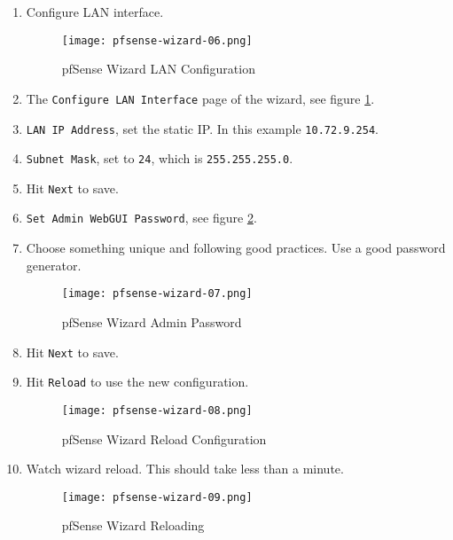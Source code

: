 \begin{enumerate}
 \item Configure LAN interface.
\begin{figure}[h!]
\begin{center}
\texttt{[image: pfsense-wizard-06.png]}
 \caption{pfSense Wizard LAN Configuration}
 \label{fig:pfsense-wizard-06}
\end{center}
\end{figure}

 \item The \texttt{Configure LAN Interface} page of the wizard, see figure \ref{fig:pfsense-wizard-06}.
 \item \texttt{LAN IP Address}, set the static IP. In this example \texttt{10.72.9.254}.
 \item \texttt{Subnet Mask}, set to \texttt{24}, which is \texttt{255.255.255.0}.
 \item Hit \texttt{Next} to save.

 \item \texttt{Set Admin WebGUI Password}, see figure \ref{fig:pfsense-wizard-07}.
 \item Choose something unique and following good practices. Use a good password generator.
\begin{figure}[h!]
\begin{center}
\texttt{[image: pfsense-wizard-07.png]}
 \caption{pfSense Wizard Admin Password}
 \label{fig:pfsense-wizard-07}
\end{center}
\end{figure}
 \item Hit \texttt{Next} to save.

 \item Hit \texttt{Reload} to use the new configuration.
\begin{figure}[h!]
\begin{center}
\texttt{[image: pfsense-wizard-08.png]}
 \caption{pfSense Wizard Reload Configuration}
 \label{fig:pfsense-wizard-08}
\end{center}
\end{figure}

 \item Watch wizard reload. This should take less than a minute.
\begin{figure}[h!]
\begin{center}
\texttt{[image: pfsense-wizard-09.png]}
 \caption{pfSense Wizard Reloading}
 \label{fig:pfsense-wizard-09}
\end{center}
\end{figure}


\end{enumerate}
